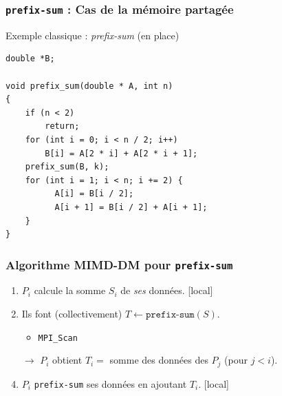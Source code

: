 \documentclass[xcolor={rgb,x11names,svgnames},rgb,x11names,svgnames]{beamer}
\begin{document}

\begin{frame}[fragile]
\frametitle{\texttt{prefix-sum} : Cas de la mémoire partagée}


\begin{block}{Exemple classique : \emph{prefix-sum} (en place)}
\begin{verbatim}
double *B;

void prefix_sum(double * A, int n)
{
    if (n < 2)
        return;
    for (int i = 0; i < n / 2; i++)
        B[i] = A[2 * i] + A[2 * i + 1];
    prefix_sum(B, k);
    for (int i = 1; i < n; i += 2) {
          A[i] = B[i / 2];
          A[i + 1] = B[i / 2] + A[i + 1];
    }
}
\end{verbatim}
\end{block}


\end{frame}



\begin{frame}
\frametitle{Algorithme MIMD-DM pour \texttt{prefix-sum}}


\bigskip

\begin{enumerate}
\item $P_i$ calcule la somme $S_i$ de \emph{ses} données. \hfill \alert{[local]}
\item Ils font (collectivement) $T \gets \texttt{prefix-sum}(S)$.
  \begin{itemize}
  \item \texttt{MPI\_Scan}
  \end{itemize}
\item[$\rightarrow$] $P_i$ obtient $T_i = $ somme des données des $P_j$ (pour $j<i$).
\item $P_i$ \texttt{prefix-sum} ses données en ajoutant $T_i$. \hfill \alert{[local]}
\end{enumerate}
\end{frame}
\end{document}
